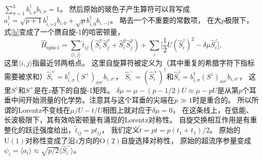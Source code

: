 $\sum_{\sigma=1}^3 b_{i, \sigma}^{ \dagger} b_{i, \sigma} = 1$。
然后原始的玻色子产生算符可以背写成
$a^{ \dagger}_i = \sqrt{p + 1}
b^{ \dagger}_{i, + 1} b_{i, 0} + \sqrt{p} b_{i, 0}^{ \dagger} b_{i, - 1}$。
略去一个不重要的常数项，
在大$p$极限下，
式\eqref{h}变成了一个赝自旋-1的哈密顿量\cite{Altman2002}，
\begin{equation}
  \hat{H}_{\text{spin-1}} = \sum_{\langle i, j \rangle} \tilde{t}_{i   j}
  (\hat{S}_i^x \hat{S}_j^x + \hat{S}_i^y \hat{S}_j^y) +  \sum_i \bigg[\frac{1}{2}U
  (\hat{S}_i^z)^2 - \delta \mu \hat{S}_i^z \bigg], \label{heffspin1}
\end{equation}
这里$\langle i, j \rangle$指最近邻两格点。
这里自旋算符被定义为（其中重复的希腊字符下指标需要被求和）$\hat{S}_i^+ = b_{i, \sigma}^{ \dagger} (S^+)_{\sigma \sigma'} b_{i, \sigma'}$，
$\hat{S}_i^- = (\hat{S}_i^+)^{ \dagger}$和$\hat{S}_i^z = b_{i, \sigma}^{ \dagger} (S^z)_{\sigma \sigma'} b_{i, \sigma'}$，
这里$S^z$和$S^+$是在$z$基下的自旋-1矩阵。
$\delta \mu = \mu - (p - 1 / 2)U \approx \mu - pU$是从第$p$个耳垂中间开始测量的化学势。注意其与这个耳垂的尖端在$p \gg 1$时是重合的。
所以所谓的Lorentz不变线在$\mu / U - t / U$相图上就对应于$\delta \mu = 0$，
在这条线上，在低能、长波极限下，其有效哈密顿量有涌现的Lorentz对称性\cite{Sachdev2017}。
自旋交换相互作用是有重整化的跃迁强度给出，$\tilde{t}_{i   j} = pt_{i   j}$，
我们定义$\tilde{t} = pt = p(t_1+t_1)/2$。
原始的$\mathrm{U} (1)$对称性变成了沿$z$方向的$\mathrm{O} (2)$自旋选择对称性，
原始的超流序参量变成$\psi_i = \langle a_i \rangle \approx \sqrt{p / 2} \langle \hat{S}_i^- \rangle$。

